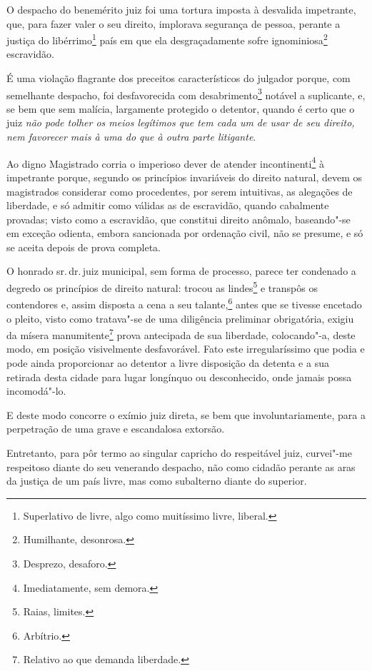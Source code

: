 O despacho do benemérito juiz foi uma tortura imposta à desvalida
impetrante, que, para fazer valer o seu direito, implorava segurança de
pessoa, perante a justiça do libérrimo\footnote{Superlativo de livre, \label{liberrimo}
  algo como muitíssimo livre, liberal.} país em que ela
desgraçadamente sofre ignominiosa\footnote{Humilhante, desonrosa.}
escravidão.

É uma violação flagrante dos preceitos característicos do julgador
porque, com semelhante despacho, foi desfavorecida com
desabrimento\footnote{Desprezo, desaforo.} notável a suplicante, e, se
bem que sem malícia, largamente protegido o detentor, quando é certo que
o juiz \emph{não pode tolher os meios legítimos que tem cada um de usar
de seu direito, nem favorecer mais à uma do que à outra parte
litigante}.

Ao digno Magistrado corria o imperioso dever de atender
incontinenti\footnote{Imediatamente, sem demora.} à impetrante porque,
segundo os princípios invariáveis do direito natural, devem os
magistrados considerar como procedentes, por serem intuitivas, as
alegações de liberdade, e só admitir como válidas as de escravidão,
quando cabalmente provadas; visto como a escravidão, que constitui
direito anômalo, baseando"-se em exceção odienta, embora sancionada por
ordenação civil, não se presume, e só se aceita depois de prova
completa.

O honrado sr.\,dr.\,juiz municipal, sem forma de processo, parece ter
condenado a degredo os princípios de direito natural: trocou as
lindes\footnote{Raias, limites.} e transpôs os contendores e, assim
disposta a cena a seu talante,\footnote{Arbítrio.} antes que se
tivesse encetado o pleito, visto como tratava"-se de uma diligência
preliminar obrigatória, exigiu da mísera manumitente\footnote{Relativo
  ao que demanda liberdade.} prova antecipada de sua liberdade,
colocando"-a, deste modo, em posição visivelmente desfavorável. Fato este
irregularíssimo que podia e pode ainda proporcionar ao detentor a livre
disposição da detenta e a sua retirada desta cidade para lugar longínquo
ou desconhecido, onde jamais possa incomodá"-lo.

E deste modo concorre o exímio juiz direta, se bem que
involuntariamente, para a perpetração de uma grave e escandalosa
extorsão.

Entretanto, para pôr termo ao singular capricho do respeitável juiz,
curvei"-me respeitoso diante do seu venerando despacho, não como cidadão
perante as aras da justiça de um país livre, mas como subalterno diante
do superior.

